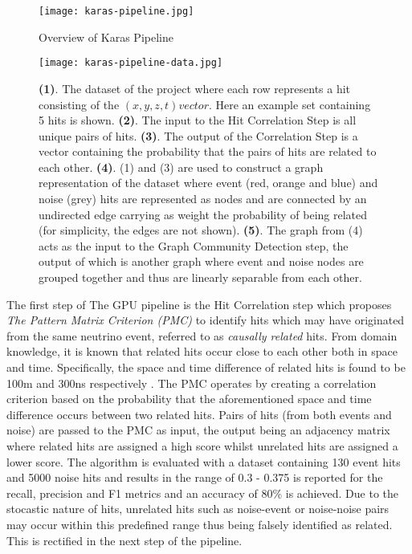 \begin{figure}[h]
  \centering
  \texttt{[image: karas-pipeline.jpg]}
  \caption{Overview of Karas Pipeline}
  \label{fig:karas-pipeline}
\end{figure}

\begin{figure}[h]
  \centering
  \texttt{[image: karas-pipeline-data.jpg]}
  \caption{\textbf{(1)}. The dataset of the project where each row
    represents a hit consisting of the $(x, y, z, t) vector$. Here an
    example set containing 5 hits is shown. \textbf{(2)}. The input to
    the Hit Correlation Step is all unique pairs of hits.
    \textbf{(3)}. The output of the Correlation Step is a vector
    containing the probability that the pairs of hits are related to
    each other. \textbf{(4)}. (1) and (3) are used to construct a
    graph representation of the dataset where event (red, orange and
    blue) and noise (grey) hits are represented as nodes and are
    connected by an undirected edge carrying as weight the probability
    of being related (for simplicity, the edges are not shown).
    \textbf{(5)}. The graph from (4) acts as the input to the Graph
    Community Detection step, the output of which is another graph
    where event and noise nodes are grouped together and thus are
    linearly separable from each other.}
  \label{fig:karas-pipeline-data}
\end{figure}

The first step of The GPU pipeline is the Hit Correlation step which
proposes \emph{The Pattern Matrix Criterion (PMC)} to identify hits
which may have originated from the same neutrino event, referred to as
\emph{causally related} hits. From domain knowledge, it is known that
related hits occur close to each other both in space and time.
Specifically, the space and time difference of related hits is found
to be 100m and 300ns respectively \cite{adrian2016letter}. The PMC
operates by creating a correlation criterion based on the probability
that the aforementioned space and time difference occurs between two
related hits. Pairs of hits (from both events and noise) are passed to
the PMC as input, the output being an adjacency matrix where related
hits are assigned a high score whilst unrelated hits are assigned a
lower score. The algorithm is evaluated with a dataset containing 130
event hits and 5000 noise hits and results in the range of 0.3 - 0.375
is reported for the recall, precision and F1 metrics and an accuracy
of 80\% is achieved. Due to the stocastic nature of hits, unrelated
hits such as noise-event or noise-noise pairs may occur within this
predefined range thus being falsely identified as related. This is
rectified in the next step of the pipeline.

